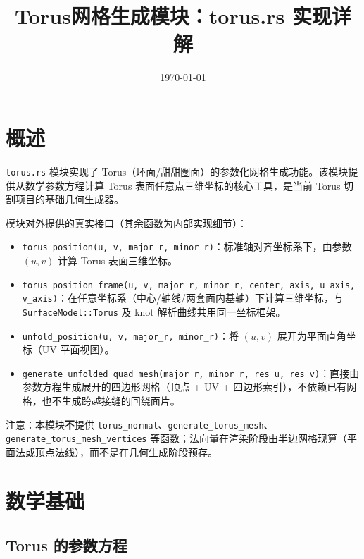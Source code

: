 \documentclass[12pt,a4paper]{article}
\title{Torus网格生成模块：torus.rs 实现详解}
\author{}
\date{\today}
\begin{document}
\maketitle

\tableofcontents

\section{概述}

\texttt{torus.rs} 模块实现了 Torus（环面/甜甜圈面）的参数化网格生成功能。该模块提供从数学参数方程计算 Torus 表面任意点三维坐标的核心工具，是当前 Torus 切割项目的基础几何生成器。

模块对外提供的真实接口（其余函数为内部实现细节）：

\begin{itemize}
\item \texttt{torus\_position(u, v, major\_r, minor\_r)}：标准轴对齐坐标系下，由参数 $(u,v)$ 计算 Torus 表面三维坐标。
\item \texttt{torus\_position\_frame(u, v, major\_r, minor\_r, center, axis, u\_axis, v\_axis)}：在任意坐标系（中心/轴线/两套面内基轴）下计算三维坐标，与 \texttt{SurfaceModel::Torus} 及 knot 解析曲线共用同一坐标框架。
\item \texttt{unfold\_position(u, v, major\_r, minor\_r)}：将 $(u,v)$ 展开为平面直角坐标（UV 平面视图）。
\item \texttt{generate\_unfolded\_quad\_mesh(major\_r, minor\_r, res\_u, res\_v)}：直接由参数方程生成展开的四边形网格（顶点 + UV + 四边形索引），不依赖已有网格，也不生成跨越接缝的回绕面片。
\end{itemize}

注意：本模块\textbf{不}提供 \texttt{torus\_normal}、\texttt{generate\_torus\_mesh}、\texttt{generate\_torus\_mesh\_vertices} 等函数；法向量在渲染阶段由半边网格现算（平面法或顶点法线），而不是在几何生成阶段预存。

\section{数学基础}

\subsection{Torus 的参数方程}
\end{document}
